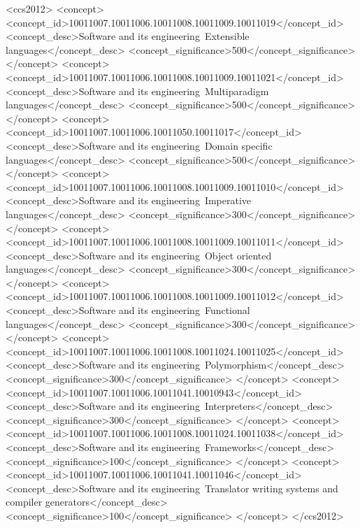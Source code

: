 \documentclass[acmsmall,10pt,screen]{acmart}
\begin{document}
%
%
\begin{CCSXML}
<ccs2012>
<concept>
<concept_id>10011007.10011006.10011008.10011009.10011019</concept_id>
<concept_desc>Software and its engineering~Extensible languages</concept_desc>
<concept_significance>500</concept_significance>
</concept>
<concept>
<concept_id>10011007.10011006.10011008.10011009.10011021</concept_id>
<concept_desc>Software and its engineering~Multiparadigm languages</concept_desc>
<concept_significance>500</concept_significance>
</concept>
<concept>
<concept_id>10011007.10011006.10011050.10011017</concept_id>
<concept_desc>Software and its engineering~Domain specific languages</concept_desc>
<concept_significance>500</concept_significance>
</concept>
<concept>
<concept_id>10011007.10011006.10011008.10011009.10011010</concept_id>
<concept_desc>Software and its engineering~Imperative languages</concept_desc>
<concept_significance>300</concept_significance>
</concept>
<concept>
<concept_id>10011007.10011006.10011008.10011009.10011011</concept_id>
<concept_desc>Software and its engineering~Object oriented languages</concept_desc>
<concept_significance>300</concept_significance>
</concept>
<concept>
<concept_id>10011007.10011006.10011008.10011009.10011012</concept_id>
<concept_desc>Software and its engineering~Functional languages</concept_desc>
<concept_significance>300</concept_significance>
</concept>
<concept>
<concept_id>10011007.10011006.10011008.10011024.10011025</concept_id>
<concept_desc>Software and its engineering~Polymorphism</concept_desc>
<concept_significance>300</concept_significance>
</concept>
<concept>
<concept_id>10011007.10011006.10011041.10010943</concept_id>
<concept_desc>Software and its engineering~Interpreters</concept_desc>
<concept_significance>300</concept_significance>
</concept>
<concept>
<concept_id>10011007.10011006.10011008.10011024.10011038</concept_id>
<concept_desc>Software and its engineering~Frameworks</concept_desc>
<concept_significance>100</concept_significance>
</concept>
<concept>
<concept_id>10011007.10011006.10011041.10011046</concept_id>
<concept_desc>Software and its engineering~Translator writing systems and compiler generators</concept_desc>
<concept_significance>100</concept_significance>
</concept>
</ccs2012>
\end{CCSXML}

%
%
\end{document}
